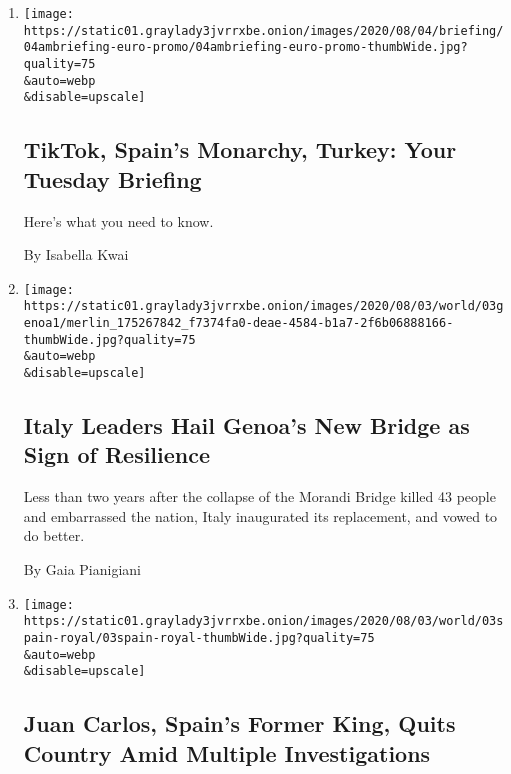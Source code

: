 \begin{enumerate}
\def\labelenumi{\arabic{enumi}.}
\item
  \href{/2020/08/03/briefing/tiktok-spain-turkey.html}{}

  \texttt{[image: https://static01.graylady3jvrrxbe.onion/images/2020/08/04/briefing/04ambriefing-euro-promo/04ambriefing-euro-promo-thumbWide.jpg?quality=75\\\&auto=webp\\\&disable=upscale]}

  \hypertarget{tiktok-spains-monarchy-turkey-your-tuesday-briefing}{%
  \subsection{TikTok, Spain's Monarchy, Turkey: Your Tuesday
  Briefing}\label{tiktok-spains-monarchy-turkey-your-tuesday-briefing}}

  Here's what you need to know.

  By Isabella Kwai
\item
  \href{/2020/08/03/world/europe/genoa-italy-new-bridge.html}{}

  \texttt{[image: https://static01.graylady3jvrrxbe.onion/images/2020/08/03/world/03genoa1/merlin\_175267842\_f7374fa0-deae-4584-b1a7-2f6b06888166-thumbWide.jpg?quality=75\\\&auto=webp\\\&disable=upscale]}

  \hypertarget{italy-leaders-hail-genoas-new-bridge-as-sign-of-resilience}{%
  \subsection{Italy Leaders Hail Genoa's New Bridge as Sign of
  Resilience}\label{italy-leaders-hail-genoas-new-bridge-as-sign-of-resilience}}

  Less than two years after the collapse of the Morandi Bridge killed 43
  people and embarrassed the nation, Italy inaugurated its replacement,
  and vowed to do better.

  By Gaia Pianigiani
\item
  \href{/2020/08/03/world/europe/juan-carlos-leaves-spain.html}{}

  \texttt{[image: https://static01.graylady3jvrrxbe.onion/images/2020/08/03/world/03spain-royal/03spain-royal-thumbWide.jpg?quality=75\\\&auto=webp\\\&disable=upscale]}

  \hypertarget{juan-carlos-spains-former-king-quits-country-amid-multiple-investigations}{%
  \subsection{Juan Carlos, Spain's Former King, Quits Country Amid
  Multiple
  Investigations}\label{juan-carlos-spains-former-king-quits-country-amid-multiple-investigations}}


\end{enumerate}
